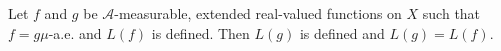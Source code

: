 Let $f$ and $g$ be $\mathcal{A}$-measurable, extended real-valued functions on $X$ such that $f = g \mu$-a.e. and $L(f)$ is defined. Then $L(g)$ is defined and $L(g) = L(f)$.